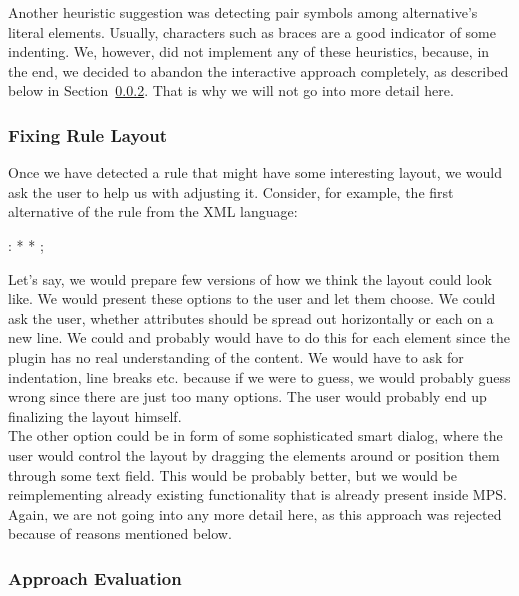 Another heuristic suggestion was detecting pair symbols among alternative's literal elements.
Usually, characters such as braces are a good indicator of some indenting.
We, however, did not implement any of these heuristics, because, in the end, we decided to abandon the interactive approach completely, as described below in Section~\ref{chap:interactive_approach_evaluation}.
That is why we will not go into more detail here.

\subsubsection{Fixing Rule Layout}

Once we have detected a rule that might have some interesting layout, we would ask the user to help us with adjusting it.
Consider, for example, the first alternative of the  rule from the XML language:

\begin{antlr}
	  :   \literal{<}  * \literal{>} * \literal{</}  \literal{>} ;
\end{antlr}

Let's say, we would prepare few versions of how we think the layout could look like.
We would present these options to the user and let them choose.
We could ask the user, whether attributes should be spread out horizontally or each on a new line.
We could and probably would have to do this for each element since the plugin has no real understanding of the content.
We would have to ask for indentation, line breaks etc. because if we were to guess, we would probably guess wrong since there are just too many options.
The user would probably end up finalizing the layout himself.
\\

The other option could be in form of some sophisticated smart dialog, where the user would control the layout by dragging the elements around or position them through some text field.
This would be probably better, but we would be reimplementing already existing functionality that is already present inside MPS.
Again, we are not going into any more detail here, as this approach was rejected because of reasons mentioned below.

\subsubsection{Approach Evaluation}
\label{chap:interactive_approach_evaluation}

